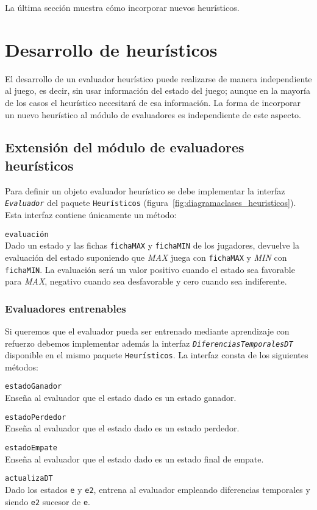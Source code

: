 \bigskip
La última sección muestra cómo incorporar nuevos heurísticos.

\section{Desarrollo de heurísticos}
\label{sec:desarrollo_heuristicos}
El desarrollo de un evaluador heurístico puede realizarse de manera independiente al juego, es decir, sin usar información del estado del juego; aunque en la mayoría de los casos el heurístico necesitará de esa información.
La forma de incorporar un nuevo heurístico al módulo de evaluadores es independiente de este aspecto.

\subsection{Extensión del módulo de evaluadores heurísticos}
\label{ssec:extension_modulo_heuristicos}
Para definir un objeto evaluador heurístico se debe implementar la interfaz \texttt{\textit{Evaluador}} del paquete \texttt{Heurísticos} (figura~\ref{fig:diagramaclases_heuristicos}).
Esta interfaz contiene únicamente un método:
\begin{description}
	\item \texttt{evaluación}\\
	Dado un estado y las fichas \texttt{fichaMAX} y \texttt{fichaMIN} de los jugadores, devuelve la evaluación del estado suponiendo que \textit{MAX} juega con \texttt{fichaMAX} y \textit{MIN} con \texttt{fichaMIN}.
	La evaluación será un valor positivo cuando el estado sea favorable para \textit{MAX}, negativo cuando sea desfavorable y cero cuando sea indiferente.
\end{description}

\subsubsection{Evaluadores entrenables}
\label{sssec:evaluadores_entrenables}
Si queremos que el evaluador pueda ser entrenado mediante aprendizaje con refuerzo debemos implementar además la interfaz \texttt{\textit{DiferenciasTemporalesDT}} disponible en el mismo paquete \texttt{Heurísticos}.
La interfaz consta de los siguientes métodos:
\begin{description}
	\item \texttt{estadoGanador}\\
	Enseña al evaluador que el estado dado es un estado ganador.
	\item \texttt{estadoPerdedor}\\
	Enseña al evaluador que el estado dado es un estado perdedor.
	\item \texttt{estadoEmpate}\\
	Enseña al evaluador que el estado dado es un estado final de empate.
	\item \texttt{actualizaDT} \\
	Dado los estados \texttt{e} y \texttt{e2}, entrena al evaluador empleando diferencias temporales y siendo \texttt{e2} sucesor de \texttt{e}.
\end{description}

